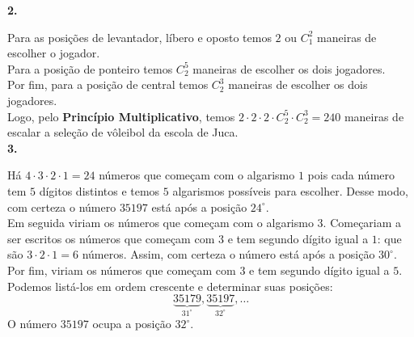 \documentclass[12pt, a4paper]{article}
\begin{document}
\textbf{2.}

Para as posições de levantador, líbero e oposto temos \(2\) ou \(C_{1}^{2}\) maneiras de escolher o jogador. \\

Para a posição de ponteiro temos \(C_{2}^{5}\) maneiras de escolher os dois jogadores. \\

Por fim, para a posição de central temos \(C_{2}^{3}\) maneiras de escolher os dois jogadores. \\

Logo, pelo \textbf{Princípio Multiplicativo}, temos 
\(2\cdot{2}\cdot{2}\cdot{C_{2}^{5}}\cdot{C_{2}^{3}} = 240\) maneiras de escalar a seleção de vôleibol da escola de Juca. \\

\textbf{3.}

Há \(4\cdot{3}\cdot{2}\cdot{1}=24\) números que começam com o algarismo \(1\) pois cada número tem \(5\) dígitos distintos e temos \(5\) algarismos possíveis para escolher. Desse modo, com certeza o número \(35197\) está após a posição \(24^{\circ}\). \\ 

Em seguida viriam os números que começam com o algarismo \(3\). Começariam a ser escritos os números que começam com \(3\) e tem segundo dígito igual a \(1\): que são \(3\cdot{2}\cdot{1} = 6\) números. Assim, com certeza o número está após a posição \(30^{\circ}\). \\

Por fim, viriam os números que começam com \(3\) e tem segundo dígito igual a \(5\). Podemos listá-los em ordem crescente e determinar suas posições: 
\[\underbrace{35179}_{31^{\circ}}, \underbrace{35197}_{32^{\circ}},\ldots\]O número \(35197\) ocupa a posição \(32^{\circ}\).  
\end{document}
